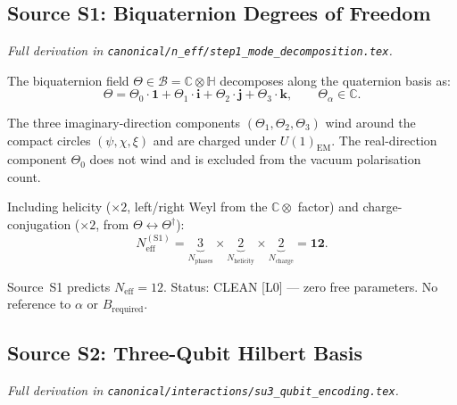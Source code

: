 \documentclass[12pt,a4paper]{article}
\theoremstyle{definition}
\theoremstyle{remark}
\begin{document}
\subsection{Source S1: Biquaternion Degrees of Freedom}
\label{ssec:S1}

\textit{Full derivation in \texttt{canonical/n\_eff/step1\_mode\_decomposition.tex}.}

\medskip
The biquaternion field $\Theta \in \mathcal{B} = \mathbb{C}\otimes\mathbb{H}$
decomposes along the quaternion basis as:
\begin{equation}
  \Theta = \Theta_0\cdot\mathbf{1}
          + \Theta_1\cdot\mathbf{i}
          + \Theta_2\cdot\mathbf{j}
          + \Theta_3\cdot\mathbf{k},
  \qquad \Theta_\alpha \in \mathbb{C}.
  \label{eq:quat_decomp}
\end{equation}

The three imaginary-direction components $(\Theta_1,\Theta_2,\Theta_3)$ wind
around the compact circles $(\psi,\chi,\xi)$ and are charged under
$U(1)_{\mathrm{EM}}$.  The real-direction component $\Theta_0$ does not wind and
is excluded from the vacuum polarisation count.

Including helicity ($\times 2$, left/right Weyl from the $\mathbb{C}\otimes$ factor)
and charge-conjugation ($\times 2$, from $\Theta \leftrightarrow \Theta^\dagger$):
\begin{equation}
  N_{\mathrm{eff}}^{(\mathrm{S1})}
  = \underbrace{3}_{N_\mathrm{phases}}
    \times
    \underbrace{2}_{N_\mathrm{helicity}}
    \times
    \underbrace{2}_{N_\mathrm{charge}}
  = \mathbf{12}.
  \label{eq:S1}
\end{equation}

\begin{resultbox}
  Source~S1 predicts $N_{\mathrm{eff}} = 12$.
  Status: CLEAN [L0] — zero free parameters.
  No reference to $\alpha$ or $B_{\mathrm{required}}$.
\end{resultbox}

\subsection{Source S2: Three-Qubit Hilbert Basis}
\label{ssec:S2}

\textit{Full derivation in \texttt{canonical/interactions/su3\_qubit\_encoding.tex}.}
\end{document}
